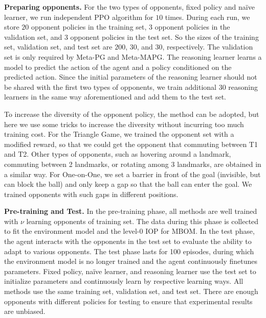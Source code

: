 \documentclass{article}
\begin{document}
\textbf{Preparing opponents.} For the two types of opponents, fixed policy and na\"ive learner, we run independent PPO \citep{schulman2017proximal} algorithm for $10$ times. During each run, we store $20$ opponent policies in the training set, $3$ opponent policies in the validation set, and $3$ opponent policies in the test set. So the sizes of the training set, validation set, and test set are $200$, $30$, and $30$, respectively. The validation set is only required by Meta-PG and Meta-MAPG. The reasoning learner learns a model to predict the action of the agent and a policy conditioned on the predicted action. Since the initial parameters of the reasoning learner should not be shared with the first two types of opponents, we train additional $30$ reasoning learners in the same way aforementioned and add them to the test set.

To increase the diversity of the opponent policy, the method \citep{tang2021discovering} can be adopted, but here we use some tricks to increase the diversity without incurring too much training cost. For the Triangle Game, we trained the opponent set with a modified reward, so that we could get the opponent that commuting between T1 and T2. Other types of opponents, such as hovering around a landmark, commuting between 2 landmarks, or rotating among 3 landmarks, are obtained in a similar way. For One-on-One, we set a barrier in front of the goal (invisible, but can block the ball) and only keep a gap so that the ball can enter the goal. We trained opponents with such gaps in different positions. 

\textbf{Pre-training and Test.} In the pre-training phase, all methods are well trained with $\nu$ learning opponents of training set. The data during this phase is collected to fit the environment model and the level-0 IOP for MBOM. In the test phase, the agent interacts with the opponents in the test set to evaluate the ability to adapt to various opponents. The test phase lasts for 100 episodes, during which the environment model is no longer trained and the agent continuously finetunes parameters. Fixed policy, na\"ive learner, and reasoning learner use the test set to initialize parameters and continuously learn by respective learning ways. All methods use the same training set, validation set, and test set. There are enough opponents with different policies for testing to ensure that experimental results are unbiased.






\end{document}

